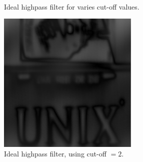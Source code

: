 \documentclass[a4paper, 10pt, final]{article}
\begin{document}
\begin{figure}[!htbp]
  \centering
   \
   \
  \caption{Ideal highpass filter for varies cut-off values.}
  \label{fig:unix_high}
\end{figure}

\begin{figure}
  \centering
  \includegraphics[width=0.60\textwidth]{./images/unix_ideal_high_result_2}
  \caption{Ideal highpass filter, using cut-off $= 2$.}
  \label{fig:unix_high2}
\end{figure}
\end{document}
